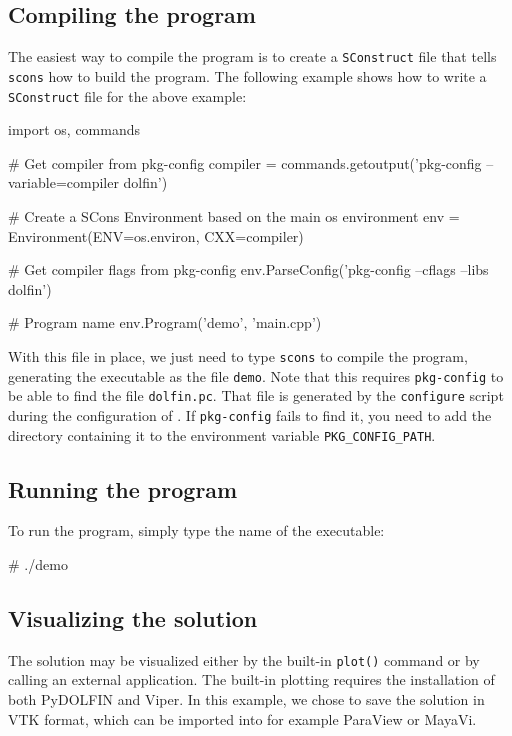 \subsection{Compiling the program}

The easiest way to compile the program is to create a
\texttt{SConstruct} file that tells \texttt{scons} how to build the
program.  The following example shows how to write a
\texttt{SConstruct} file for the above example:
\footnotesize
\begin{code}
import os, commands

# Get compiler from pkg-config
compiler = commands.getoutput('pkg-config --variable=compiler dolfin')

# Create a SCons Environment based on the main os environment
env = Environment(ENV=os.environ, CXX=compiler)

# Get compiler flags from pkg-config
env.ParseConfig('pkg-config --cflags --libs dolfin')

# Program name
env.Program('demo', 'main.cpp')
\end{code}
\normalsize

With this file in place, we just need to type
\texttt{scons} to compile the program, generating the executable as the
file \texttt{demo}. Note that this requires \texttt{pkg-config} to be
able to find the file \texttt{dolfin.pc}. That file is generated by
the \texttt{configure} script during the configuration of
\dolfin{}. If \texttt{pkg-config} fails to find it, you need to add
the directory containing it to the environment variable
\texttt{PKG\_CONFIG\_PATH}.

\subsection{Running the program}

To run the program, simply type the name of the executable:
\begin{code}
# ./demo
\end{code}

\subsection{Visualizing the solution}

The solution may be visualized either by the built-in \texttt{plot()}
command or by calling an external application. The built-in plotting
requires the installation of both PyDOLFIN and Viper. In this
example, we chose to save the solution in VTK format, which can be
imported into for example ParaView or MayaVi.

